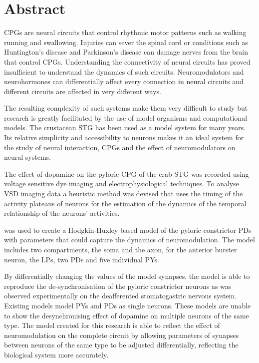 \acresetall
\chapter{Abstract}
\label{chap:Abstract}

\Acp{CPG} are neural circuits that control rhythmic motor patterns such as walking running and swallowing.  Injuries can sever the spinal cord or conditions such as Huntington's disease and Parkinson's disease can damage nerves from the brain that control \acp{CPG}. Understanding the connectivity of neural circuits has proved insufficient to understand the dynamics of such circuits. Neuromodulators and neurohormones can differentially affect every connection in neural circuits and different circuits are affected in very different ways. 


The resulting complexity of such systems make them very difficult to study but research is greatly facilitated by the use of model organisms and computational models. The crustacean \ac{STG} has been used as a model system for many years. Its relative simplicity and accessibility to neurons makes it an ideal system for the study of neural interaction, \acp{CPG} and the effect of neuromodulators on neural systems.

The effect of dopamine on the pyloric \ac{CPG} of the crab \ac{STG} was recorded using voltage sensitive dye imaging and electrophysiological techniques. To analyse \ac{VSD} imaging data a heuristic method was devised that uses the timing of the activity plateaus of neurons for the estimation of the dynamics of the temporal relationship of the neurons' activities.

\matlab was used to create a Hodgkin-Huxley based model of the pyloric constrictor \acp{PD} with parameters that could capture the dynamics of neuromodulation. The \matlab model includes two compartments, the soma and the axon, for the anterior burster neuron, the \acp{LP}, two \acp{PD} and five individual \acp{PY}. 

By differentially changing the values of the model synapses, the model is able to reproduce the de-synchronisation of the pyloric constrictor neurons as was observed experimentally on the deafferented stomatogastric nervous system. Existing models model \acp{PY} and \acp{PD} as single neurons. These models are unable to show the desynchronising effect of dopamine on multiple neurons of the same type. The model created for this research is able to reflect the effect of neuromodulation on the complete circuit by allowing parameters of synapses between neurons of the same type to be adjusted differentially, reflecting the biological system more accurately.
